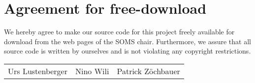 \documentclass[11pt]{article}
\begin{document}

\newpage


\newpage
\section*{Agreement for free-download}
\bigskip


\bigskip


\large We hereby agree to make our source code for this project freely available for download from the web pages of the SOMS chair. Furthermore, we assure that all source code is written by ourselves and is not violating any copyright restrictions.

\begin{center}

\bigskip


\bigskip


\begin{tabular}{@{}p{4cm}@{}p{4cm}@{}@{}p{4cm}@{}}

\begin{minipage}{4cm}
\vspace{2cm}
\large Urs Lustenberger
\end{minipage}

&

\begin{minipage}{4cm}

\vspace{2cm}
 \large \hspace{4mm} Nino Wili

\end{minipage}

&

\begin{minipage}{4cm}
\vspace{2cm}
\large Patrick Z\"ochbauer

\end{minipage}
\end{tabular}


\end{center}
\newpage




\end{document}
